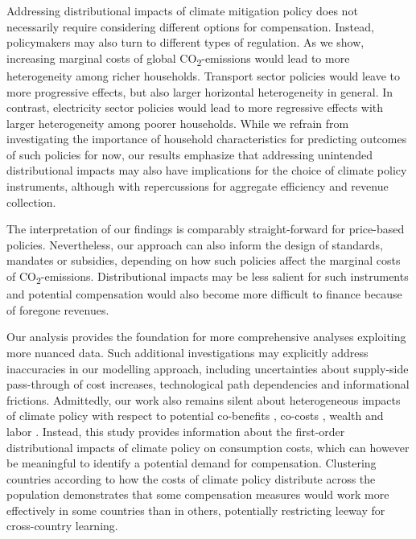 \documentclass[12pt, a4paper]{article}
\begin{document}
Addressing distributional impacts of climate mitigation policy does not necessarily require considering different options for compensation. Instead, policymakers may also turn to different types of regulation. As we show, increasing marginal costs of global CO\textsubscript{2}-emissions would lead to more heterogeneity among richer households. Transport sector policies would leave to more progressive effects, but also larger horizontal heterogeneity in general. In contrast, electricity sector policies would lead to more regressive effects with larger heterogeneity among poorer households. While we refrain from investigating the importance of household characteristics for predicting outcomes of such policies for now, our results emphasize that addressing unintended distributional impacts may also have implications for the choice of climate policy instruments, although with repercussions for aggregate efficiency and revenue collection. 

The interpretation of our findings is comparably straight-forward for price-based policies. Nevertheless, our approach can also inform the design of standards, mandates or subsidies, depending on how such policies affect the marginal costs of CO\textsubscript{2}-emissions. Distributional impacts may be less salient for such instruments and potential compensation would also become more difficult to finance because of foregone revenues. %

Our analysis provides the foundation for more comprehensive analyses exploiting more nuanced data. Such additional investigations may explicitly address inaccuracies in our modelling approach, including uncertainties about supply-side pass-through of cost increases, technological path dependencies and informational frictions. Admittedly, our work also remains silent about heterogeneous impacts of climate policy with respect to potential co-benefits \autocite[e.g.,][]{Holland.2019,Karlsson.2020}, co-costs \autocite[e.g.,][]{Fuje.2019,Greve.2022}, wealth \autocite[e.g.,][]{Fullerton.2011} and labor \autocite[e.g.,][]{Castellanos.2024}. Instead, this study provides information about the first-order distributional impacts of climate policy on consumption costs, which can however be meaningful to identify a potential demand for compensation. Clustering countries according to how the costs of climate policy distribute across the population demonstrates that some compensation measures would work more effectively in some countries than in others, potentially restricting leeway for cross-country learning. %
\end{document}
